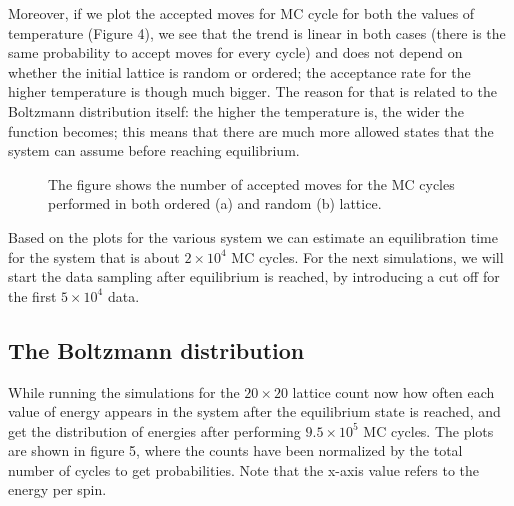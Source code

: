 \documentclass[%
 reprint,
 amsmath,amssymb,
 aps,
]{revtex4-1}
\theoremstyle{plain}
\theoremstyle{definition}
\theoremstyle{plain}
\begin{document}
Moreover, if we plot the accepted moves for MC cycle for both the values of temperature (Figure 4), we see that the trend is linear in both cases (there is the same probability to accept moves for every cycle) and does not depend on whether the initial lattice is random or ordered; the acceptance rate for the higher temperature is though much bigger. The reason for that is related to the Boltzmann distribution itself: the higher the temperature is, the wider the function becomes; this means that there are much more allowed states that the system can assume before reaching equilibrium. 

\begin{figure}
	\label{AcceptedMoves}
	\caption{The figure shows the number of accepted moves for the MC cycles performed in both ordered (a) and random (b) lattice.}	
\end{figure}

Based on the plots for the various system we can estimate an equilibration time for the system that is about $2\times10^4$ MC cycles. For the next simulations, we will start the data sampling after equilibrium is reached, by introducing a cut off for the first $5\times10^4$ data.

\subsection{The Boltzmann distribution}
While running the simulations for the $20\times20$ lattice count now how often each value of energy appears in the system after the equilibrium state is reached, and get the distribution of energies after performing $9.5\times10^5$ MC cycles. 
The plots are shown in figure 5, where the counts have been normalized by the total number of cycles to get probabilities. Note that the x-axis value refers to the energy per spin.
\end{document}
